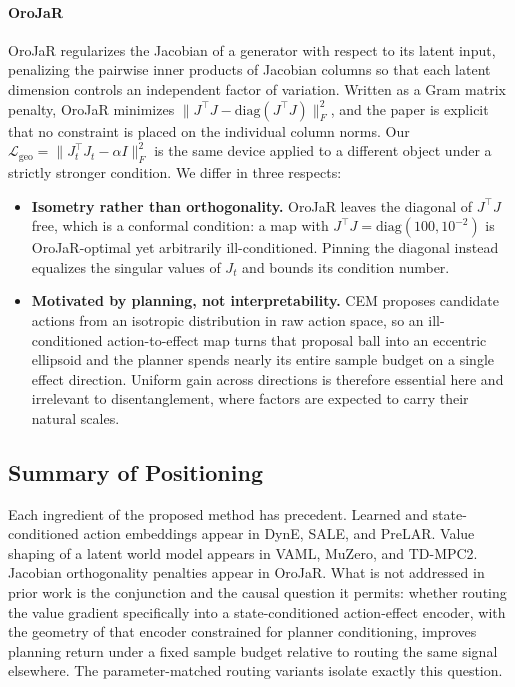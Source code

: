 ﻿\documentclass{article}
\begin{document}
\paragraph{OroJaR}
OroJaR regularizes the Jacobian of a generator with respect to its latent input,
penalizing the pairwise inner products of Jacobian columns so that each latent
dimension controls an independent factor of variation. Written as a Gram matrix
penalty, OroJaR minimizes $\|J^\top J - \mathrm{diag}(J^\top J)\|_F^2$, and the paper
is explicit that no constraint is placed on the individual column norms. Our
$\mathcal{L}_{\text{geo}} = \|J_t^\top J_t - \alpha I\|_F^2$ is the same device applied
to a different object under a strictly stronger condition. We differ in three respects:
\begin{itemize}
  \item \textbf{Isometry rather than orthogonality.} OroJaR leaves the diagonal of
  $J^\top J$ free, which is a conformal condition: a map with
  $J^\top J = \mathrm{diag}(100, 10^{-2})$ is OroJaR-optimal yet arbitrarily
  ill-conditioned. Pinning the diagonal instead equalizes the singular values of
  $J_t$ and bounds its condition number.
  \item \textbf{Motivated by planning, not interpretability.} CEM proposes candidate
  actions from an isotropic distribution in raw action space, so an ill-conditioned
  action-to-effect map turns that proposal ball into an eccentric ellipsoid and the
  planner spends nearly its entire sample budget on a single effect direction.
  Uniform gain across directions is therefore essential here and irrelevant to
  disentanglement, where factors are expected to carry their natural scales.

\end{itemize}


\subsection{Summary of Positioning}

Each ingredient of the proposed method has precedent. Learned and
state-conditioned action embeddings appear in DynE, SALE, and PreLAR. Value
shaping of a latent world model appears in VAML, MuZero, and TD-MPC2. Jacobian
orthogonality penalties appear in OroJaR. What is not addressed in prior work is
the conjunction and the causal question it permits: whether routing the value
gradient specifically into a state-conditioned action-effect encoder, with the
geometry of that encoder constrained for planner conditioning, improves planning
return under a fixed sample budget relative to routing the same signal elsewhere.
The parameter-matched routing variants isolate exactly this question.
\end{document}
